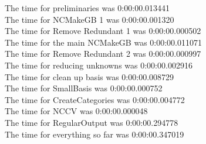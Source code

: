 \documentclass[rep10,leqno]{report}
\begin{document}
\noindent
The time for preliminaries was 0:00:00.013441\\
The time for NCMakeGB 1 was 0:00:00.001320\\
The time for Remove Redundant 1 was 0:00:00.000502\\
The time for the main NCMakeGB was 0:00:00.011071\\
The time for Remove Redundant 2 was 0:00:00.000997\\
The time for reducing unknowns was 0:00:00.002916\\
The time for clean up basis was 0:00:00.008729\\
The time for SmallBasis was 0:00:00.000752\\
The time for CreateCategories was 0:00:00.004772\\
The time for NCCV was 0:00:00.000048\\
The time for RegularOutput was 0:00:00.294778\\
The time for everything so far was 0:00:00.347019\\
\end{document}
